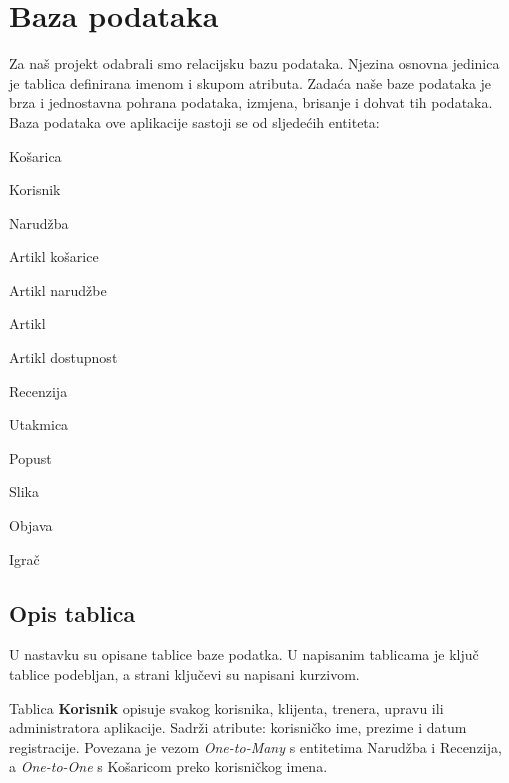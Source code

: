 	
		

		

				
		\section{Baza podataka}
			
			
		\textnormal{Za naš projekt odabrali smo relacijsku bazu podataka. Njezina osnovna jedinica je tablica definirana imenom i skupom atributa. Zadaća naše baze podataka je brza i jednostavna pohrana podataka, izmjena, brisanje i dohvat tih podataka. Baza podataka ove aplikacije sastoji se od sljedećih entiteta:}
		\smallbreak
			\begin{packed_item}
				\setlength\itemsep{0.01em}
			\item  Košarica
			\item  Korisnik
			\item  Narudžba
			\item Artikl košarice
			\item Artikl narudžbe
			\item Artikl
			\item Artikl dostupnost
			\item Recenzija
			\item Utakmica
			\item Popust
			\item Slika
			\item Objava
			\item Igrač
		\end{packed_item}
		
		\pagebreak
		
			\subsection{Opis tablica}
			
				\textnormal{U nastavku su opisane tablice baze podatka. U napisanim tablicama je ključ tablice podebljan, a strani ključevi su napisani kurzivom.}
				
				\bigbreak

				\textnormal{Tablica \textbf{Korisnik} opisuje svakog korisnika, klijenta, trenera, upravu ili administratora aplikacije. Sadrži atribute: korisničko ime, prezime i datum registracije. Povezana je vezom \textit{One-to-Many} s entitetima Narudžba i Recenzija, a \textit{One-to-One} s Košaricom preko korisničkog imena.}
				
